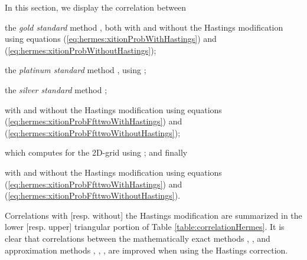 In this section, we display the correlation between
\begin{inparaenum}[\em 1\upshape)]
\item the {\em gold standard} method \rnamfpt, both with and without the Hastings
modification using equations (\ref{eq:hermes:xitionProbWithHastings}) and
(\ref{eq:hermes:xitionProbWithoutHastings});
\item the {\em platinum standard} method \rnaeq, using
;
\item the {\em silver standard} method \kinfold;
\item \fftmfpt with and without the Hastings modification using equations
(\ref{eq:hermes:xitionProbFfttwoWithHastings}) and
(\ref{eq:hermes:xitionProbFfttwoWithoutHastings});
\item \ffteq which computes \eqt for the 2D-grid using
; and finally
\item \rnatwofold with and without the Hastings modification using equations
(\ref{eq:hermes:xitionProbFfttwoWithHastings}) and
(\ref{eq:hermes:xitionProbFfttwoWithoutHastings}).
\end{inparaenum}
Correlations
with [resp. without] the Hastings modification are summarized in the
lower [resp. upper] triangular portion of
Table \ref{table:correlationHermes}. It is clear that correlations between
the mathematically exact methods \rnamfpt, \rnaeq, and
approximation methods \kinfold, \fftmfpt, \ffteq, \rnatwofold are
improved when using the Hastings correction.

